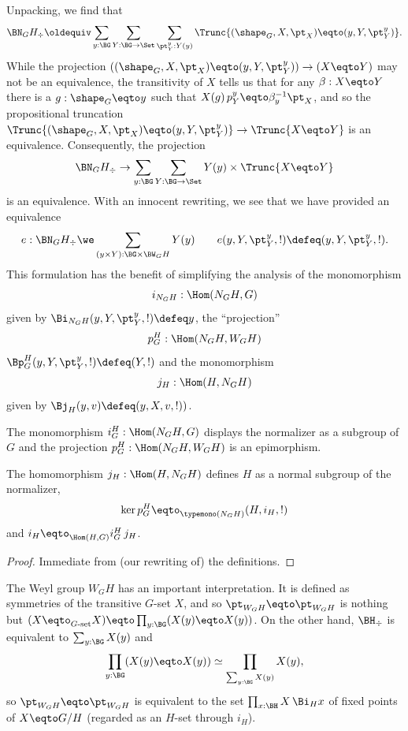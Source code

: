 Unpacking, we find that
$$\BN_GH_\div\oldequiv \sum_{y:\BG}\sum_{Y:\BG\to\Set}\sum_{\pt^y_Y:Y(y)} \Trunc{(\sh_G,X,\pt_X)\eqto (y,Y,\pt^y_Y)}.$$
While the projection $((\sh_G,X,\pt_X)\eqto (y,Y,\pt^y_Y))\to (X\eqto Y)$ may not be an equivalence, the transitivity of $X$ tells us that for any $\beta:X\eqto Y$ there is a $g:\sh_G\eqto y$ such that $X(g)\,p^y_Y\eqto \beta^{-1}_y\pt_X$, and so the propositional truncation $\Trunc{(\sh_G,X,\pt_X)\eqto (y,Y,\pt^y_Y)} \to \Trunc{X\eqto Y}$ is an equivalence.
Consequently, the projection
$$\BN_GH_\div\to \sum_{y:\BG}\sum_{Y:\BG\to\Set}Y(y)\times\Trunc{X\eqto Y}$$
is an equivalence.  With an innocent rewriting, we see that we have provided an equivalence
$$e:\BN_GH_\div\we\sum_{(y\times Y):\BG\times \BW_GH}Y(y)\qquad e(y,Y,\pt^y_Y,!)\defeq (y,Y,\pt^y_Y,!).$$
This formulation has the benefit of simplifying the analysis of the monomorphism
$$i_{N_GH}:\Hom(N_GH,G)$$
given by $\Bi_{N_GH}(y,Y,\pt^y_Y,!)\defeq y$, the ``projection''
 $$p_G^H:\Hom(N_GH,W_GH)$$
$\Bp_G^H(y,Y,\pt^y_Y,!)\defeq (Y,!)$ and the monomorphism
$$j_H:\Hom(H,N_GH)$$
given by $\Bj_H(y,v)\defeq(y,X,v,!))$.




\begin{lemma}
  The monomorphism $i_G^H:\Hom(N_GH,G)$ displays the normalizer as a subgroup of $G$ and the projection $p_G^H:\Hom(N_GH,W_GH)$ is an epimorphism.

The homomorphism $j_H:\Hom(H,N_GH)$ defines $H$ as a normal subgroup of the normalizer,
$$\ker p_G^H\eqto _{\typemono(N_GH)\wip{?for?}}(H,i_H,!)$$
and $i_H\eqto _{\Hom(H,G)}i_G^H\,j_H$.
\end{lemma}
\begin{proof}
  Immediate from (our rewriting of) the definitions.
\end{proof}

The Weyl group $W_GH$ has an important interpretation.  It is defined as symmetries of the transitive $G$-set $X$, and so $\pt_{W_GH}\eqto \pt_{W_GH}$ is nothing but $(X\eqto _{G\text{-set}}X)\eqto \prod_{y:\BG}(X(y)\eqto X(y))$.  On the other hand, $\BH_\div$ is equivalent to $\sum_{y:\BG}X(y)$ and
$$\prod_{y:\BG}(X(y)\eqto X(y))\simeq \prod_{\sum_{y:\BG}X(y)}X(y),$$ so $\pt_{W_GH}\eqto \pt_{W_GH}$ is equivalent to the set $%
\prod_{x:\BH}X\, \Bi_Hx$ of fixed points of $X\eqto G/H$ (regarded as an $H$-set through $i_H$).

